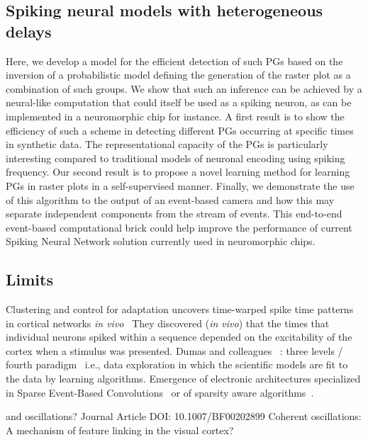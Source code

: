 \documentclass[brainsci, %
               review,submit,pdftex,moreauthors
               ]{Definitions/mdpi}
\begin{document}
\subsection{Spiking neural models with heterogeneous delays}
Here, we develop a model for the efficient detection of such PGs based on the inversion of a probabilistic model defining the generation of the raster plot as a combination of such groups. We show that such an inference can be achieved by a neural-like computation that could itself be used as a spiking neuron, as can be implemented in a neuromorphic chip for instance. A first result is to show the efficiency of such a scheme in detecting different PGs occurring at specific times in synthetic data. The representational capacity of the PGs is particularly interesting compared to traditional models of neuronal encoding using spiking frequency. Our second result is to propose a novel learning method for learning PGs in raster plots in a self-supervised manner. Finally, we demonstrate the use of this algorithm to the output of an event-based camera and how this may separate independent components from the stream of events. This end-to-end event-based computational brick could help improve the performance of current Spiking Neural Network solution currently used in neuromorphic chips.


\subsection{Limits}

Clustering and control for adaptation uncovers time-warped spike time patterns in cortical networks \textit{in vivo}~\citep{isbister_clustering_2021} They discovered (\textit{in vivo}) that the times that individual neurons spiked within a sequence depended on the excitability of the cortex when a stimulus was presented.
Dumas and colleagues~\citep{panahi_generative_2021} : three levels / fourth paradigm~\citep{tolle_fourth_2011} i.e., data exploration in which the scientific models are fit to the data by learning algorithms.
Emergence of electronic architectures specialized in Sparse Event-Based Convolutions~\citep{di_mauro_alfio_sne_2022} or of sparsity aware algorithms~\citep{yin_sata_2022}.

and oscillations? Journal Article DOI: 10.1007/BF00202899 Coherent oscillations: A mechanism of feature linking in the visual cortex?
\end{document}
